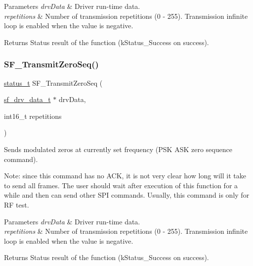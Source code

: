\begin{DoxyParams}{Parameters}
{\em drv\+Data} & Driver run-\/time data. \\
\hline
{\em repetitions} & Number of transmission repetitions (0 -\/ 255). Transmission infinite loop is enabled when the value is negative.\\
\hline
\end{DoxyParams}
\begin{DoxyReturn}{Returns}
Status result of the function (k\+Status\+\_\+\+Success on success). 
\end{DoxyReturn}
\mbox{\label{group__sf__functions__group_gaa6162b63ca5d9cc56c054ea2bddac1f2}} 
\subsubsection{\texorpdfstring{SF\_TransmitZeroSeq()}{SF\_TransmitZeroSeq()}}
{\footnotesize\ttfamily \mbox{\hyperlink{group__ksdk__common_gaaabdaf7ee58ca7269bd4bf24efcde092}{status\+\_\+t}} S\+F\+\_\+\+Transmit\+Zero\+Seq (\begin{DoxyParamCaption}\item[{\mbox{\hyperlink{structsf__drv__data__t}{sf\+\_\+drv\+\_\+data\+\_\+t}} $\ast$}]{drv\+Data,  }\item[{int16\+\_\+t}]{repetitions }\end{DoxyParamCaption})}



Sends modulated zeros at currently set frequency (P\+SK A\+SK zero sequence command). 

Note\+: since this command has no A\+CK, it is not very clear how long will it take to send all frames. The user should wait after execution of this function for a while and then can send other S\+PI commands. Usually, this command is only for RF test.


\begin{DoxyParams}{Parameters}
{\em drv\+Data} & Driver run-\/time data. \\
\hline
{\em repetitions} & Number of transmission repetitions (0 -\/ 255). Transmission infinite loop is enabled when the value is negative.\\
\hline
\end{DoxyParams}
\begin{DoxyReturn}{Returns}
Status result of the function (k\+Status\+\_\+\+Success on success). 
\end{DoxyReturn}
\mbox{\label{group__sf__functions__group_gab933b60af5327c7f6289680308f94d5f}} 
